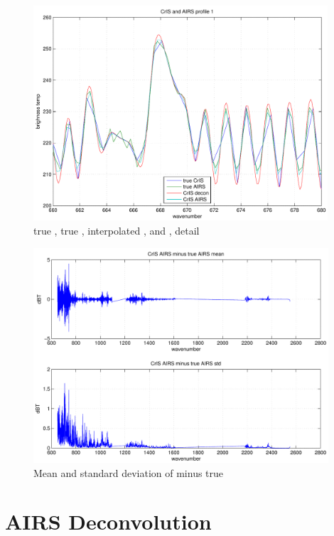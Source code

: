\documentclass[12pt]{article}
\begin{document}
\begin{figure}
  \centering
  \includegraphics[height=8cm]{figures/cris_airs_zoom.pdf}
  \caption{true {\cris}, true {\airs}, interpolated {\cris}, and
    {\cris} {\airs}, detail}
  \label{cazoom}
\end{figure}

\begin{figure}
  \centering
  \includegraphics[height=8cm]{figures/cris_airs_diff.pdf}
  \caption{Mean and standard deviation of {\cris} {\airs} minus true
    {\airs}}
  \label{cadiff}
\end{figure}

\FloatBarrier

\section{AIRS Deconvolution}
\label{decon}

\renewcommand{\vec}[1]{\mathbf{#1}}

\end{document}
